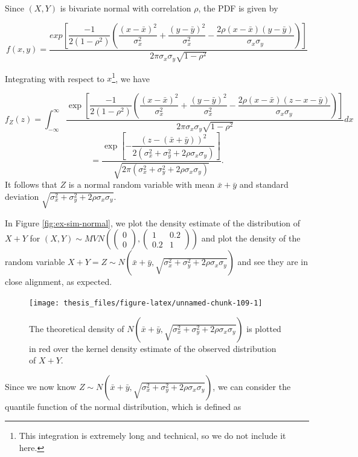 \documentclass[12pt,twoside]{smiththesis}
\begin{document}
Since \((X,Y)\) is bivariate normal with correlation \(\rho\), the PDF is given by

\[f(x,y) = \dfrac{exp\left[\dfrac{-1}{2(1-\rho^2)} \left( \dfrac{(x-\bar x)^2}{\sigma_x^2}+\dfrac{(y-\bar y)^2}{\sigma_x^2} - \dfrac{2 \rho (x-\bar x)(y-\bar y)}{\sigma_x\sigma_y} \right)\right]}{2\pi \sigma_x \sigma_y \sqrt{1- \rho^2}}\]

Integrating with respect to \(x\)\footnote{This integration is extremely long and technical, so we do not include it here.}, we have

\[f_Z(z)  = \int_{-\infty}^\infty \dfrac{\exp\left[\dfrac{-1}{2(1-\rho^2)} \left( \dfrac{(x-\bar x)^2}{\sigma_x^2}+\dfrac{(y-\bar y)^2}{\sigma_x^2} - \dfrac{2 \rho (x-\bar x)(z-x-\bar y)}{\sigma_x\sigma_y} \right)\right]}{2\pi \sigma_x \sigma_y \sqrt{1- \rho^2}} dx \]
\[=\dfrac{\exp\left[-\dfrac{(z-(\bar x + \bar y ))^2}{2(\sigma^2_x+\sigma^2_y + 2\rho \sigma_x \sigma_y)}\right]}{\sqrt{2\pi(\sigma_x^2 + \sigma_y^2 + 2\rho \sigma_x \sigma_y)}}.\]
It follows that \(Z\) is a normal random variable with mean \(\bar x + \bar y\) and standard deviation \(\sqrt{\sigma_x^2 +\sigma_y^2 + 2 \rho \sigma_x \sigma_y }\).

In Figure \ref{fig:ex-sim-normal}, we plot the density estimate of the distribution of \(X+Y\) for \((X,Y) \sim MVN\left( \begin{pmatrix} 0\\0 \end{pmatrix}, \begin{pmatrix} 1 & 0.2 \\0.2 & 1 \end{pmatrix}\right)\) and plot the density of the random variable \(X+Y = Z \sim N\left(\bar x + \bar y,\sqrt{\sigma_x^2 +\sigma_y^2 + 2 \rho \sigma_x \sigma_y }\right)\) and see they are in close alignment, as expected.
\begin{figure}

{\centering \texttt{[image: thesis\_files/figure-latex/unnamed-chunk-109-1]} 

}

\caption{\label{fig:ex-sim-normal} The theoretical density of $N\left(\bar x + \bar y,\sqrt{\sigma_x^2 +\sigma_y^2 + 2 \rho \sigma_x \sigma_y }\right)$ is plotted in red over the kernel density estimate of the observed distribution of $X+Y$.}\label{fig:unnamed-chunk-109}
\end{figure}
Since we now know \(Z \sim N\left(\bar x + \bar y,\sqrt{\sigma_x^2 +\sigma_y^2 + 2 \rho \sigma_x \sigma_y }\right)\), we can consider the quantile function of the normal distribution, which is defined as
\end{document}
